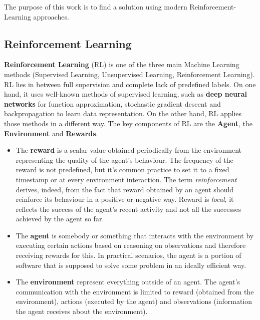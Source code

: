 \documentclass[12pt]{article}
\begin{document}
The purpose of this work is to find a solution using modern Reinforcement-Learning approaches.  

\subsection{Reinforcement Learning}\label{RL}
\textbf{Reinforcement Learning} (RL) is one of the three main Machine Learning methods (Supervised Learning, Unsupervised Learning, Reinforcement Learning). RL lies in between full supervision and complete lack of predefined labels. On one hand, it uses well-known methods of supervised learning, such as \textbf{deep neural networks} for function approximation, stochastic gradient descent and backpropagation to learn data representation. On the other hand, RL applies those methods in a different way.  The key components of RL are the \textbf{Agent}, the \textbf{Environment} and \textbf{Rewards}.

\begin{itemize}
    \item 
    The \textbf{reward} is a scalar value obtained periodically from the environment representing the quality of the agent's behaviour. The frequency of the reward is not predefined, but it's common practice to set it to a fixed timestamp or at every environment interaction. The term \textit{reinforcement} derives, indeed, from the fact that reward obtained by an agent should reinforce its behaviour in a positive or negative way. Reward is \textit{local}, it reflects the success of the agent's recent activity and not all the successes achieved by the agent so far.
        
    \item 
    The \textbf{agent} is somebody or something that interacts with the environment by executing certain actions based on reasoning on observations and therefore receiving rewards for this. In practical scenarios, the agent is a portion of software that is supposed to solve some problem in an ideally efficient way. 
        
    \item 
    The \textbf{environment} represent everything outside of an agent. The agent's communication with the environment is limited to reward (obtained from the environment), actions (executed by the agent) and observations (information the agent receives about the environment).
    
\end{itemize}
\end{document}
